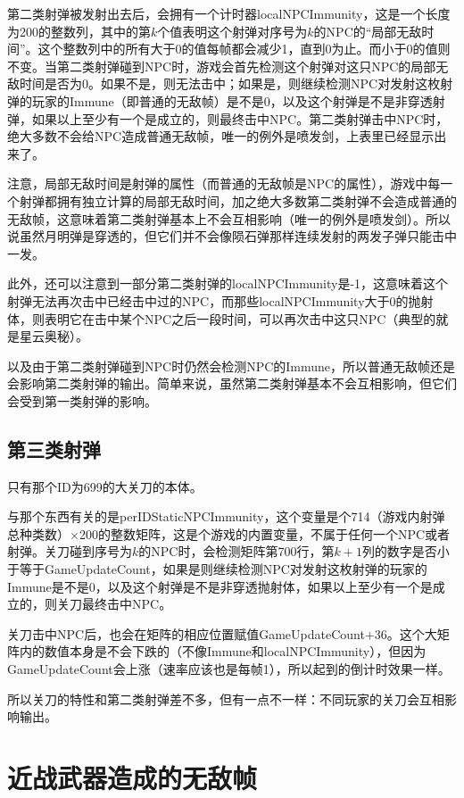 第二类射弹被发射出去后，会拥有一个计时器localNPCImmunity，这是一个长度为200的整数列，其中的第$k$个值表明这个射弹对序号为$k$的NPC的“局部无敌时间”。这个整数列中的所有大于0的值每帧都会减少1，直到0为止。而小于0的值则不变。当第二类射弹碰到NPC时，游戏会首先检测这个射弹对这只NPC的局部无敌时间是否为0。如果不是，则无法击中；如果是，则继续检测NPC对发射这枚射弹的玩家的Immune（即普通的无敌帧）是不是0，以及这个射弹是不是非穿透射弹，如果以上至少有一个是成立的，则最终击中NPC。第二类射弹击中NPC时，绝大多数不会给NPC造成普通无敌帧，唯一的例外是喷发剑，上表里已经显示出来了。

注意，局部无敌时间是射弹的属性（而普通的无敌帧是NPC的属性），游戏中每一个射弹都拥有独立计算的局部无敌时间，加之绝大多数第二类射弹不会造成普通的无敌帧，这意味着第二类射弹基本上不会互相影响（唯一的例外是喷发剑）。所以说虽然月明弹是穿透的，但它们并不会像陨石弹那样连续发射的两发子弹只能击中一发。

此外，还可以注意到一部分第二类射弹的localNPCImmunity是-1，这意味着这个射弹无法再次击中已经击中过的NPC，而那些localNPCImmunity大于0的抛射体，则表明它在击中某个NPC之后一段时间，可以再次击中这只NPC（典型的就是星云奥秘）。

以及由于第二类射弹碰到NPC时仍然会检测NPC的Immune，所以普通无敌帧还是会影响第二类射弹的输出。简单来说，虽然第二类射弹基本不会互相影响，但它们会受到第一类射弹的影响。

\subsection{第三类射弹}

只有那个ID为699的大关刀的本体。

与那个东西有关的是perIDStaticNPCImmunity，这个变量是个714（游戏内射弹总种类数）$\times$200的整数矩阵，这是个游戏的内置变量，不属于任何一个NPC或者射弹。关刀碰到序号为$k$的NPC时，会检测矩阵第700行，第$k+1$列的数字是否小于等于GameUpdateCount，如果是则继续检测NPC对发射这枚射弹的玩家的Immune是不是0，以及这个射弹是不是非穿透抛射体，如果以上至少有一个是成立的，则关刀最终击中NPC。

关刀击中NPC后，也会在矩阵的相应位置赋值GameUpdateCount+36。这个大矩阵内的数值本身是不会下跌的（不像Immune和localNPCImmunity），但因为GameUpdateCount会上涨（速率应该也是每帧1），所以起到的倒计时效果一样。

所以关刀的特性和第二类射弹差不多，但有一点不一样：不同玩家的关刀会互相影响输出。

\section{近战武器造成的无敌帧}

